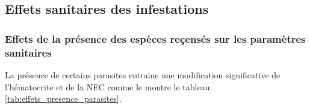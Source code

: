 \elandscape

\subsection{Effets sanitaires des infestations}
\subsubsection{Effets de la présence des espèces reçensés sur les paramètres sanitaires}

La présence de certains parasites entraine une modification significative de l’hématocrite et de la NEC comme le montre le tableau \ref{tab:effets_presence_parasites}.

\begin{longtable}[t]{p{2.5cm}c>{\centering}p{4cm}c>{\centering}p{3cm}c}
	

\end{longtable}
